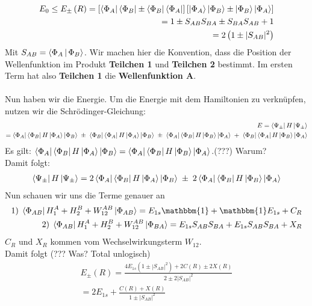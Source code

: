 \begin{align}
E_0 \leq E_{\pm} \left( R \right) = \left[ \Bra{\Phi_A} \Bra{\Phi_B} \pm \Bra{\Phi_B} \Bra{\Phi_A} \right] \left[ \Ket{\Phi_A} \Ket{\Phi_B} \pm \Ket{\Phi_B} \Ket{\Phi_A} \right] \\
= 1 \pm S_{AB}S_{BA} \pm S_{BA}S_{AB} + 1 \\
= 2 \left( 1 \pm |S_{AB}|^2 \right)
\end{align}
Mit $S_{AB} = \Braket{\Phi_A | \Phi_B}$. Wir machen hier die Konvention, dass die Position der Wellenfunktion im Produkt \textbf{Teilchen 1} und \textbf{Teilchen 2} bestimmt. Im ersten Term hat also \textbf{Teilchen 1} die \textbf{Wellenfunktion A}.\\
\\
Nun haben wir die Energie. Um die Energie mit dem Hamiltonien zu verkn\"upfen, nutzen wir die Schr\"odinger-Gleichung:
\begin{align}
E = \Bra{\Psi_{\pm}} H \Ket{\Psi_{\pm}} \\
= \Bra{\Phi_A} \Bra{\Phi_B} H \Ket{\Phi_A} \Ket{\Phi_B} \; \pm \; \Bra{\Phi_B} \Bra{\Phi_A} H \Ket{\Phi_A} \Ket{\Phi_B} \; \pm \; \Bra{\Phi_A} \Bra{\Phi_B} H \Ket{\Phi_B} \Ket{\Phi_A} \; + \; \Bra{\Phi_B} \Bra{\Phi_A} H \Ket{\Phi_B} \Ket{\Phi_A}
\end{align}
Es gilt: $\Bra{\Phi_A} \Bra{\Phi_B} H \Ket{\Phi_A} \Ket{\Phi_B} = \Bra{\Phi_A} \Bra{\Phi_B} H \Ket{\Phi_B} \Ket{\Phi_A}$.(???) Warum?\\
Damit folgt:
\begin{align}
\Bra{\Psi_{\pm}} H \Ket{\Psi_{\pm}} = 2 \Bra{\Phi_A} \Bra{\Phi_B} H \Ket{\Phi_A} \Ket{\Phi_B} \; \pm \; 2 \Bra{\Phi_A} \Bra{\Phi_B} H \Ket{\Phi_B} \Ket{\Phi_A} 
\end{align}
Nun schauen wir uns die Terme genauer an
\begin{align}
1) \; \Bra{\Phi_{AB}} H_1^A + H_2^B + W_{12}^{AB} \Ket{\Phi_{AB}} = E_{1s} \mathbbm{1} + \mathbbm{1} E_{1s} + C_R \\
2) \; \Bra{\Phi_{AB}} H_1^A + H_2^B + W_{12}^{AB} \Ket{\Phi_{BA}} = E_{1s} S_{AB} S_{BA} + E_{1s} S_{AB} S_{BA} + X_R
\end{align}
$C_R$ und $X_R$ kommen vom Wechselwirkungsterm $W_{12}$.\\
Damit folgt (??? Was? Total unlogisch)
\begin{align}
E_{\pm} \left( R \right) = \frac{4 E_{1s} \left(1 \pm |S_{AB}|^2 \right) + 2 C \left( R \right) \pm 2X \left( R \right)}{2 \pm 2 |S_{AB}|^2} \\
= 2 E_{1s} + \frac{C \left( R \right) + X \left( R \right)}{1 \pm |S_{AB}|^2}
\end{align}

